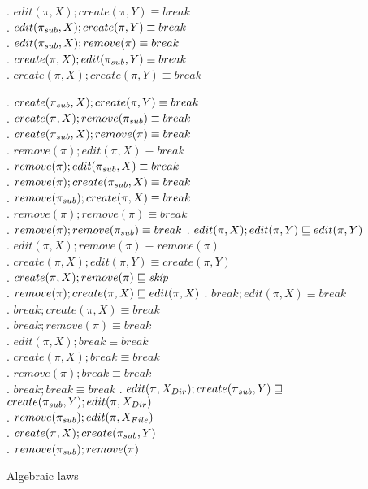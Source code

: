\begin{table}[H]
\begin{table}[thb]
{{{\begin{minipage}{8.3cm}
\lawx. \(edit(\pi,X); create(\pi,Y) \equiv break\)\\
\lawxi. \(edit(\pi_{sub},X); create(\pi,Y) \equiv break\)\\
\lawxii. \(edit(\pi_{sub},X); remove(\pi) \equiv break\)\\
\lawxiii. \(create(\pi,X); edit(\pi_{sub},Y) \equiv break\)\\
\lawxiv. \(create(\pi,X); create(\pi,Y) \equiv break\)\\
\end{minipage}\begin{minipage}{7.2cm}\setlength{\rightskip}{0cm plus 7cm}
\lawxv. \(create(\pi_{sub},X); create(\pi,Y) \equiv break\)\\
\lawxvi. \(create(\pi,X); remove(\pi_{sub}) \equiv break\)\\
\lawxvii. \(create(\pi_{sub},X); remove(\pi) \equiv break\)\\
\lawxviii. \(remove(\pi); edit(\pi,X) \equiv break\)\\
\lawxix. \(remove(\pi); edit(\pi_{sub},X) \equiv break\)\\
\lawxx. \(remove(\pi); create(\pi_{sub},X) \equiv break\)\\
\lawxxi. \(remove(\pi_{sub}); create(\pi,X) \equiv break\)\\
\lawxxii. \(remove(\pi); remove(\pi) \equiv break\)\\
\lawxxiii. \(remove(\pi); remove(\pi_{sub}) \equiv break\)
\lawxxiv. \(edit(\pi,X); edit(\pi,Y) \sqsubseteq edit(\pi,Y)\)\\
\lawxxv. \(edit(\pi,X); remove(\pi) \equiv remove(\pi)\)\\ 
\lawxxvi. \(create(\pi,X); edit(\pi,Y) \equiv create(\pi,Y)\)\\
\lawxxvii. \(create(\pi,X); remove(\pi) \sqsubseteq \mathit{skip}\)\\
\lawxxviii. \(remove(\pi); create(\pi,X) \sqsubseteq edit(\pi,X)\)
\lawxxix. \(break; edit(\pi,X) \equiv break\)\\
\lawxxx. \(break; create(\pi,X) \equiv break\)\\
\lawxxxi. \(break; remove(\pi) \equiv break\)\\
\lawxxxii. \(edit(\pi,X); break \equiv break\)\\
\lawxxxiii. \(create(\pi,X); break \equiv break\)\\
\lawxxxiv. \(remove(\pi); break \equiv break\)\\
\lawxxxv. \(break; break \equiv break\)
\lawiibp. \(edit(\pi,X_{Dir}); create(\pi_{sub},Y)\sqsupseteq\)\\\indent\(%
create(\pisub,Y); edit(\pi,\cdir{X})\)\\
\lawiiic. \(remove(\pi_{sub}); edit(\pi,X_{File})\)\\
\lawxxxvi. \(create(\pi,X); create(\pi_{sub},Y)\)\\
\lawxxxvii. \(remove(\pi_{sub}); remove(\pi)\)
\end{minipage}
}}
}
\caption{Algebraic laws}
\end{table}


\end{table}
